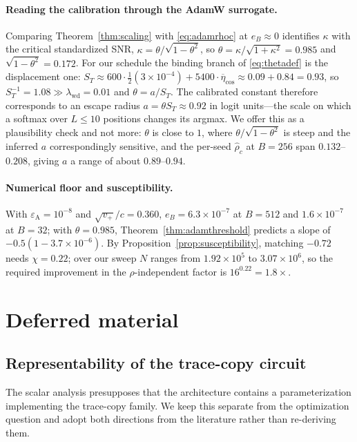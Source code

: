 \documentclass{article}
\theoremstyle{plain}
\theoremstyle{definition}
\theoremstyle{remark}
\newcommand{\1}{\mathbf{1}}
\newcommand{\wdc}{\mathrm{wd}}
\begin{document}
\paragraph{Reading the calibration through the AdamW surrogate.}
Comparing Theorem~\ref{thm:scaling} with \eqref{eq:adamrhoc} at $e_B\approx0$
identifies $\kappa$ with the critical standardized SNR,
$\kappa = \theta/\sqrt{1-\theta^2}$, so $\theta = \kappa/\sqrt{1+\kappa^2} =
0.985$ and $\sqrt{1-\theta^2} = 0.172$. For our schedule the binding branch of
\eqref{eq:thetadef} is the displacement one:
$S_T\approx600\cdot\tfrac12(3{\times}10^{-4}) + 5400\cdot\overline\eta_{\cos}
\approx0.09+0.84 = 0.93$, so $S_T^{-1} = 1.08\gg\lambda_\wdc = 0.01$ and
$\theta = a/S_T$. The calibrated constant therefore corresponds to an escape
radius $a = \theta S_T\approx0.92$ in logit units---the scale on which a softmax
over $L\le10$ positions changes its argmax. We offer this as a plausibility check
and not more: $\theta$ is close to $1$, where $\theta/\sqrt{1-\theta^2}$ is steep
and the inferred $a$ correspondingly sensitive, and the per-seed $\hat\rho_c$ at
$B = 256$ span $0.132$--$0.208$, giving $a$ a range of about $0.89$--$0.94$.

\paragraph{Numerical floor and susceptibility.}
With $\varepsilon_{\mathrm A} = 10^{-8}$ and $\sqrt{v_+}/c = 0.360$,
$e_B = 6.3\times10^{-7}$ at $B = 512$ and $1.6\times10^{-7}$ at $B = 32$; with
$\theta = 0.985$, Theorem~\ref{thm:adamthreshold} predicts a slope of
$-0.5(1-3.7\times10^{-6})$. By Proposition~\ref{prop:susceptibility}, matching
$-0.72$ needs $\chi = 0.22$; over our sweep $N$ ranges from $1.92\times10^5$ to
$3.07\times10^6$, so the required improvement in the $\rho$-independent factor is
$16^{0.22} = 1.8\times$.

\section{Deferred material}
\label{app:deferred}

\subsection{Representability of the trace-copy circuit}
\label{app:repr}

The scalar analysis presupposes that the architecture contains a parameterization
implementing the trace-copy family. We keep this separate from the optimization
question and adopt both directions from the literature rather than re-deriving
them.
\end{document}
